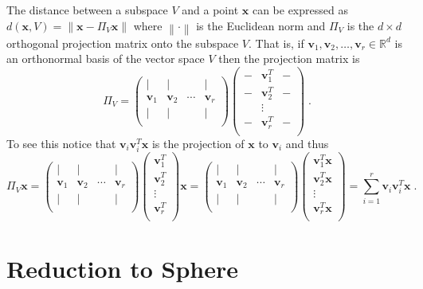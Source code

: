 \documentclass[12pt]{article}
\newcommand{\R}{\mathbb{R}}
\newcommand{\norm}[1]{\left\|#1\right\|}
\renewcommand{\v}{\mathbf{v}}
\newcommand{\x}{\mathbf{x}}
\begin{document}
The distance between a subspace $V$ and a point $\x$ can be expressed as
$d(\x,V) = \norm{\x - \Pi_V \x}$
where $\norm{\cdot}$ is the Euclidean norm and $\Pi_V$ is
the $d \times d$ orthogonal projection matrix onto the subspace $V$.
That is, if $\v_1, \v_2, \dots, \v_r \in \R^d$ is an orthonormal basis
of the vector space $V$ then the projection matrix is
$$
\Pi_V =
\begin{pmatrix}
\vert & \vert &  & \vert \\
\v_1 & \v_2 & \cdots & \v_r \\
\vert & \vert &  & \vert \\
\end{pmatrix}
\begin{pmatrix}
- & \v_1^T & - \\
- & \v_2^T & - \\
  & \vdots &  \\
- & \v_r^T & - \\
\end{pmatrix} \; .
$$
To see this notice that $\v_i \v_i^T \x$ is the projection of $\x$ to $\v_i$
and thus
$$
\Pi_V \x
=
\begin{pmatrix}
\vert & \vert &  & \vert \\
\v_1 & \v_2 & \cdots & \v_r \\
\vert & \vert &  & \vert \\
\end{pmatrix}
\begin{pmatrix}
\v_1^T \\
\v_2^T \\
\vdots  \\
\v_r^T \\
\end{pmatrix}
\x
=
\begin{pmatrix}
\vert & \vert &  & \vert \\
\v_1 & \v_2 & \cdots & \v_r \\
\vert & \vert &  & \vert \\
\end{pmatrix}
\begin{pmatrix}
\v_1^T \x\\
\v_2^T \x\\
\vdots  \\
\v_r^T \x\\
\end{pmatrix}
= \sum_{i=1}^r \v_i \v_i^T \x \; .
$$

\section{Reduction to Sphere}
\label{section:sphere-reduction}
\end{document}
